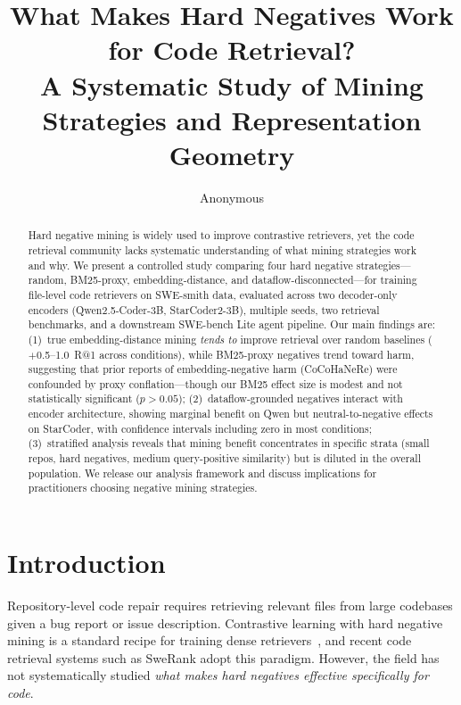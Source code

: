 \documentclass[11pt]{article}
\title{What Makes Hard Negatives Work for Code Retrieval?\\A Systematic Study of Mining Strategies and Representation Geometry}
\author{Anonymous}
\date{}
\newcommand{\pp}{\,\text{pp}}
\begin{document}
\maketitle

\begin{abstract}
Hard negative mining is widely used to improve contrastive retrievers, yet the code retrieval community lacks systematic understanding of what mining strategies work and why.
We present a controlled study comparing four hard negative strategies---random, BM25-proxy, embedding-distance, and dataflow-disconnected---for training file-level code retrievers on SWE-smith data, evaluated across two decoder-only encoders (Qwen2.5-Coder-3B, StarCoder2-3B), multiple seeds, two retrieval benchmarks, and a downstream SWE-bench Lite agent pipeline.
Our main findings are: (1)~true embedding-distance mining \emph{tends to} improve retrieval over random baselines ($+$0.5--1.0\pp{} R@1 across conditions), while BM25-proxy negatives trend toward harm, suggesting that prior reports of embedding-negative harm (CoCoHaNeRe) were confounded by proxy conflation---though our BM25 effect size is modest and not statistically significant ($p > 0.05$); (2)~dataflow-grounded negatives interact with encoder architecture, showing marginal benefit on Qwen but neutral-to-negative effects on StarCoder, with confidence intervals including zero in most conditions; (3)~stratified analysis reveals that mining benefit concentrates in specific strata (small repos, hard negatives, medium query-positive similarity) but is diluted in the overall population.
We release our analysis framework and discuss implications for practitioners choosing negative mining strategies.
\end{abstract}

\section{Introduction}
\label{sec:intro}

Repository-level code repair requires retrieving relevant files from large codebases given a bug report or issue description.
Contrastive learning with hard negative mining is a standard recipe for training dense retrievers~\citep{karpukhin2020dense,xiong2021approximate}, and recent code retrieval systems such as SweRank adopt this paradigm.
However, the field has not systematically studied \emph{what makes hard negatives effective specifically for code}.
\end{document}
